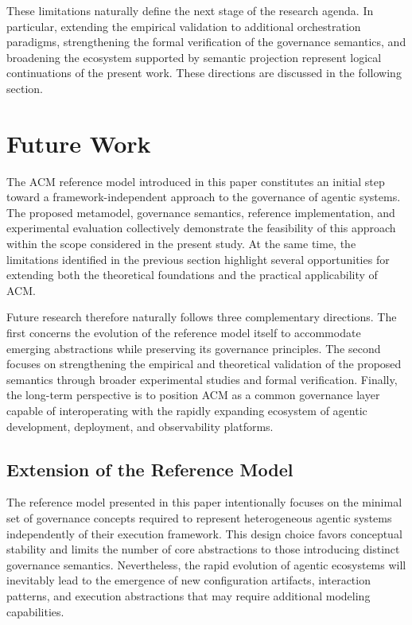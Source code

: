 \documentclass[10pt]{article}
\begin{document}
These limitations naturally define the next stage of the research agenda. In particular, extending the empirical validation to additional orchestration paradigms, strengthening the formal verification of the governance semantics, and broadening the ecosystem supported by semantic projection represent logical continuations of the present work. These directions are discussed in the following section.

\section{Future Work}
\label{sec:future_work}

The ACM reference model introduced in this paper constitutes an initial step toward a framework-independent approach to the governance of agentic systems. The proposed metamodel, governance semantics, reference implementation, and experimental evaluation collectively demonstrate the feasibility of this approach within the scope considered in the present study. At the same time, the limitations identified in the previous section highlight several opportunities for extending both the theoretical foundations and the practical applicability of ACM.

Future research therefore naturally follows three complementary directions. The first concerns the evolution of the reference model itself to accommodate emerging abstractions while preserving its governance principles. The second focuses on strengthening the empirical and theoretical validation of the proposed semantics through broader experimental studies and formal verification. Finally, the long-term perspective is to position ACM as a common governance layer capable of interoperating with the rapidly expanding ecosystem of agentic development, deployment, and observability platforms.

\subsection{Extension of the Reference Model}
\label{sec:future_reference_model}

The reference model presented in this paper intentionally focuses on the minimal set of governance concepts required to represent heterogeneous agentic systems independently of their execution framework. This design choice favors conceptual stability and limits the number of core abstractions to those introducing distinct governance semantics. Nevertheless, the rapid evolution of agentic ecosystems will inevitably lead to the emergence of new configuration artifacts, interaction patterns, and execution abstractions that may require additional modeling capabilities.
\end{document}
